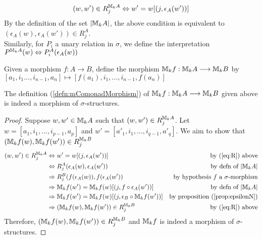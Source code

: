\begin{equation}
(w,w') \in R^{{\mathbb{M}_{k}A}}_{j} \Leftrightarrow w' = w[(j,\epsilon_{A}(w'))] \label{eq:R}
\end{equation}
By the definition of the set $|{\mathbb{M}_{k}A}|$, the above condition is equivalent to $(\epsilon_{A}(w),\epsilon_{A}(w')) \in R^{A}_{j}$. \\
Similarly, for $P_{i}$ a unary relation in $\sigma$, we define the interpretation $P^{{\mathbb{M}_{k}A}}(w) \Leftrightarrow P^{A}_{i}(\epsilon_{A}(w))$
\begin{defn}
Given a morphism $f:A \longrightarrow B$, define the morphism ${\mathbb{M}_{k}f}:{\mathbb{M}_{k}A} \longrightarrow {\mathbb{M}_{k}B}$ by $[a_{1},i_{1}\dots,i_{n-1},a_{n}] \mapsto [f(a_{1}),i_{1},\dots,i_{n-1},f(a_{n})]$
\label{defn:mComonadMorphism}
\end{defn}
\begin{prop}
The definition (\ref{defn:mComonadMorphism}) of ${\mathbb{M}_{k}f}:{\mathbb{M}_{k}A} \longrightarrow {\mathbb{M}_{k}B}$ given above is indeed a morphism of $\sigma$-structures. 
\begin{proof}
Suppose $w,w' \in {\mathbb{M}_{k}A}$ such that $(w,w') \in R_{j}^{{\mathbb{M}_{k}A}}$. Let $w = [a_{1},i_{1},\dots,i_{p-1},a_{p}]$ and $w' = [a'_{1},i_{1},\dots,i_{q-1},a'_{q}]$. We aim to show that $({\mathbb{M}_{k}f}(w),{\mathbb{M}_{k}f}(w')) \in R_{j}^{{\mathbb{M}_{k}B}}$ \\
\begin{align*}
(w,w') \in R_{j}^{{\mathbb{M}_{k}A}} &\Leftrightarrow w' = w[(j,\epsilon_{A}(w'))] & \text{by (\ref{eq:R}) above} \\
&\Leftrightarrow R_{j}^{A}(\epsilon_{A}(w),\epsilon_{A}(w')) & \text{by defn of } |{\mathbb{M}_{k}A}| \\
&\Rightarrow R_{j}^{B}(f(\epsilon_{A}(w)),f(\epsilon_{A}(w')) & \text{by hypothesis $f$ a $\sigma$-morphism} \\
&\Rightarrow {\mathbb{M}_{k}f}(w') = {\mathbb{M}_{k}f}(w)[(j,f \circ \epsilon_{A}(w'))] & \text{by defn of } |{\mathbb{M}_{k}A}| \\
&\Rightarrow {\mathbb{M}_{k}f}(w') = {\mathbb{M}_{k}f}(w)[(j,\epsilon_{B} \circ {\mathbb{M}_{k}f}(w'))] & \text{by proposition (\ref{prop:epsilonN})}\\
&\Rightarrow ({\mathbb{M}_{k}f}(w),{\mathbb{M}_{k}f}(w')) \in R_{j}^{{\mathbb{M}_{k}B}} & \text{by (\ref{eq:R}) above}
\end{align*}
Therefore, $({\mathbb{M}_{k}f}(w),{\mathbb{M}_{k}f}(w')) \in R_{j}^{{\mathbb{M}_{k}B}}$ and ${\mathbb{M}_{k}f}$ is indeed a morphism of $\sigma$-structures. 
\end{proof}
\end{prop}
